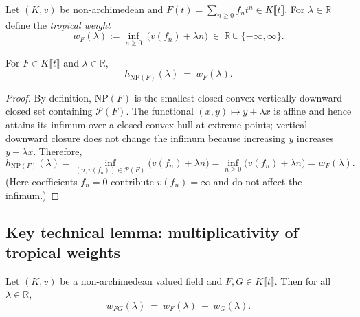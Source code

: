 \begin{definition}
  \label{def:tropical_weight}
  
  \leanok
  
  
  Let $(K,v)$ be non-archimedean and $F(t)=\sum_{n\ge 0} f_n t^n\in K\llbracket t\rrbracket$.
  For $\lambda\in\mathbb{R}$ define the \emph{tropical weight}
  \[
    w_F(\lambda) := \inf_{n\ge 0}\ \big(v(f_n)+\lambda n\big)\ \in\ \mathbb{R}\cup\{-\infty,\infty\}.
  \]
\end{definition}

\begin{lemma}
  \label{lem:support_newton_polygon}
  
  \leanok
  For $F\in K\llbracket t\rrbracket$ and $\lambda\in\mathbb{R}$,
  \[
    h_{\mathrm{NP}(F)}(\lambda)\ =\ w_F(\lambda).
  \]
\end{lemma}

\begin{proof}
 
  By definition, $\mathrm{NP}(F)$ is the smallest closed convex vertically downward closed set containing $\mathcal{P}(F)$.
  The functional $(x,y)\mapsto y+\lambda x$ is affine and hence attains its infimum over a closed convex hull
  at extreme points; vertical downward closure does not change the infimum because increasing $y$ increases $y+\lambda x$.
  Therefore,
  \[
    h_{\mathrm{NP}(F)}(\lambda)=\inf_{(n,v(f_n))\in\mathcal{P}(F)}\big(v(f_n)+\lambda n\big)
    =\inf_{n\ge 0}\big(v(f_n)+\lambda n\big)=w_F(\lambda).
  \]
  (Here coefficients $f_n=0$ contribute $v(f_n)=\infty$ and do not affect the infimum.)
\end{proof}

\subsection{Key technical lemma: multiplicativity of tropical weights}

\begin{lemma}
  \label{lem:tropical_weight_mul}
  
  \leanok
  Let $(K,v)$ be a non-archimedean valued field and $F,G\in K\llbracket t\rrbracket$.
  Then for all $\lambda\in\mathbb{R}$,
  \[
    w_{FG}(\lambda)\ =\ w_F(\lambda)\ +\ w_G(\lambda).
  \]
\end{lemma}

